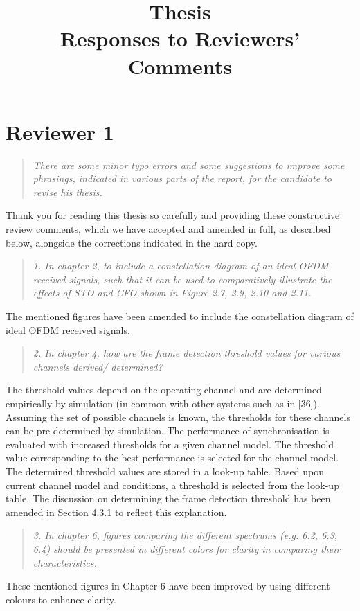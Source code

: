 \documentclass{article}
\title{Thesis\\ Responses to Reviewers' Comments}
\begin{document}
\maketitle

\section*{Reviewer 1}

\begin{quote}
\emph{There are some minor typo errors and some suggestions to improve some phrasings, indicated in various parts of the report, for the candidate to revise his thesis.}
\end{quote}
Thank you for reading this thesis so carefully and providing these constructive review comments, which we have accepted and amended in full, as described below, alongside the corrections indicated in the hard copy.

\begin{quote}
\emph{1. In chapter 2, to include a constellation diagram of an ideal OFDM received signals, such that it can be used to comparatively illustrate the effects of STO and CFO shown in Figure 2.7, 2.9, 2.10 and 2.11.}
\end{quote}
The mentioned figures have been amended to include the constellation diagram of ideal OFDM received signals.

\begin{quote}
\emph{2. In chapter 4, how are the frame detection threshold values for various channels derived/ determined?}
\end{quote}
The threshold values depend on the operating channel and are determined empirically by simulation (in common with other systems such as in [36]). Assuming the set of possible channels is known, the thresholds for these channels can be pre-determined by simulation. The performance of synchronisation is evaluated with increased thresholds for a given channel model. The threshold value corresponding to the best performance is selected for the channel model. The determined threshold values are stored in a look-up table. Based upon current channel model and conditions, a threshold is selected from the look-up table.
The discussion on determining the frame detection threshold has been amended in Section 4.3.1 to reflect this explanation.

\begin{quote}
\emph{3. In chapter 6, figures comparing the different spectrums (e.g. 6.2, 6.3, 6.4) should be presented in different colors for clarity in comparing their characteristics.}
\end{quote}
These mentioned figures in Chapter 6 have been improved by using different colours to enhance clarity.
\end{document}

